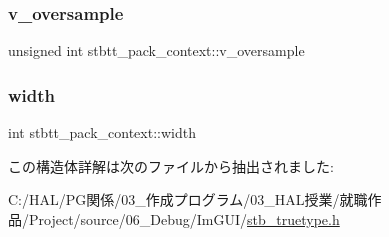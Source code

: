 \subsubsection{\texorpdfstring{v\+\_\+oversample}{v\_oversample}}
{\footnotesize\ttfamily unsigned int stbtt\+\_\+pack\+\_\+context\+::v\+\_\+oversample}

\mbox{\label{structstbtt__pack__context_a5da0b7b5d3b82d5fc75ea1c8945183fa}} 
\subsubsection{\texorpdfstring{width}{width}}
{\footnotesize\ttfamily int stbtt\+\_\+pack\+\_\+context\+::width}



この構造体詳解は次のファイルから抽出されました\+:\begin{DoxyCompactItemize}
\item 
C\+:/\+H\+A\+L/\+P\+G関係/03\+\_\+作成プログラム/03\+\_\+\+H\+A\+L授業/就職作品/\+Project/source/06\+\_\+\+Debug/\+Im\+G\+U\+I/\mbox{\hyperlink{stb__truetype_8h}{stb\+\_\+truetype.\+h}}\end{DoxyCompactItemize}
